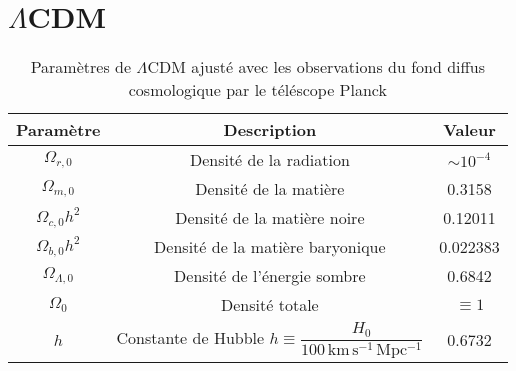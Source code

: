 \chapter{$\Lambda$CDM}\label{app:lcdm}


\begin{table}[H]
        \centering
        \caption{Paramètres de $\Lambda$CDM ajusté avec les observations du fond diffus cosmologique par le téléscope Planck \citep{PlanckCollaboration2018}}
        \label{tab:cosmos}
        \begin{tabular}{ccc}
                \hline
                Paramètre & Description & Valeur \\\hline \hline
                $\Omega_{r,0}$ & Densité de la radiation & $\sim 10^{-4}$\\
                $\Omega_{m,0}$  &Densité de la matière & 0.3158 \\
                $\Omega_{c,0}h^{2}$  & Densité de la matière noire & 0.12011\\
                $\Omega_{b,0}h^{2}$ & Densité de la matière baryonique & 0.022383\\
                $\Omega_{\Lambda,0}$ &Densité de l'énergie sombre & 0.6842\\
                $\Omega_0$ & Densité totale & $\equiv 1$\\
                $h$ & Constante de Hubble $h \equiv \dfrac{H_0}{100\, \mathrm{km}\,\mathrm{s}^{-1}\, \mathrm{Mpc^{-1}}}$ & $0.6732$ \\
               \hline 
        \end{tabular}
\end{table}

